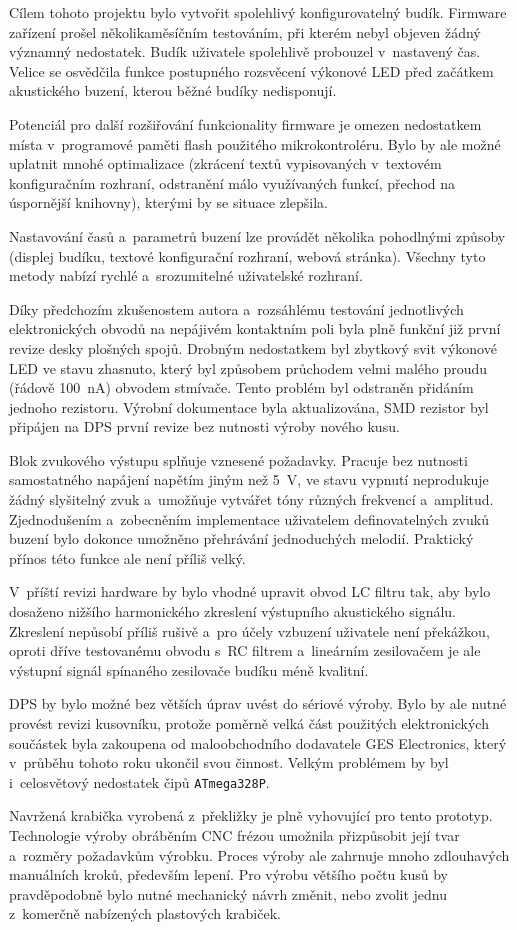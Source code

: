 Cílem tohoto projektu bylo vytvořit spolehlivý konfigurovatelný budík.
Firmware zařízení prošel několikaměsíčním testováním, při kterém nebyl objeven
žádný významný nedostatek. Budík uživatele spolehlivě probouzel v~nastavený
čas. Velice se osvědčila funkce postupného rozsvěcení výkonové \acs{LED} před
začátkem akustického buzení, kterou běžné budíky nedisponují.

Potenciál pro další rozšiřování funkcionality firmware je omezen nedostatkem
místa v~programové paměti flash použitého mikrokontroléru. Bylo by ale možné
uplatnit mnohé optimalizace (zkrácení textů vypisovaných v~textovém
konfiguračním rozhraní, odstranění málo využívaných funkcí, přechod na
úspornější knihovny), kterými by se situace zlepšila.

Nastavování časů a~parametrů buzení lze provádět několika pohodlnými způsoby
(displej budíku, textové konfigurační rozhraní, webová stránka). Všechny tyto
metody nabízí rychlé a~srozumitelné uživatelské rozhraní.

Díky předchozím zkušenostem autora a~rozsáhlému testování jednotlivých
elektronických obvodů na nepájivém kontaktním poli byla plně funkční již první
revize desky plošných spojů. Drobným nedostatkem byl zbytkový svit výkonové LED
ve stavu zhasnuto, který byl způsobem průchodem velmi malého proudu (řádově
\SI{100}{\nano\ampere}) obvodem stmívače. Tento problém byl odstraněn přidáním
jednoho rezistoru. Výrobní dokumentace byla aktualizována, SMD rezistor byl
připájen na \acs{DPS} první revize bez nutnosti výroby nového kusu.

Blok zvukového výstupu splňuje vznesené požadavky. Pracuje bez nutnosti
samostatného napájení napětím jiným než \SI{5}{\volt}, ve stavu vypnutí
neprodukuje žádný slyšitelný zvuk a~umožňuje vytvářet tóny různých frekvencí
a~amplitud. Zjednodušením a~zobecněním implementace uživatelem definovatelných
zvuků buzení bylo dokonce umožněno přehrávání jednoduchých melodií. Praktický
přínos této funkce ale není příliš velký.

V~příští revizi hardware by bylo vhodné upravit obvod LC filtru tak, aby bylo
dosaženo nižšího harmonického zkreslení výstupního akustického signálu.
Zkreslení nepůsobí příliš rušivě a~pro účely vzbuzení uživatele není překážkou,
oproti dříve testovanému obvodu s~RC filtrem a~lineárním zesilovačem je ale
výstupní signál spínaného zesilovače budíku méně kvalitní.

DPS by bylo možné bez větších úprav uvést do sériové výroby. Bylo by ale nutné
provést revizi kusovníku, protože poměrně velká část použitých elektronických
součástek byla zakoupena od maloobchodního dodavatele GES Electronics, který
v~průběhu tohoto roku ukončil svou činnost. Velkým problémem by byl
i~celosvětový nedostatek čipů \texttt{ATmega328P}.

Navržená krabička vyrobená z~překližky je plně vyhovující pro tento prototyp.
Technologie výroby obráběním \acs{CNC} frézou umožnila přizpůsobit její tvar
a~rozměry požadavkům výrobku. Proces výroby ale zahrnuje mnoho zdlouhavých
manuálních kroků, především lepení. Pro výrobu většího počtu kusů by
pravděpodobně bylo nutné mechanický návrh změnit, nebo zvolit jednu z~komerčně
nabízených plastových krabiček.
